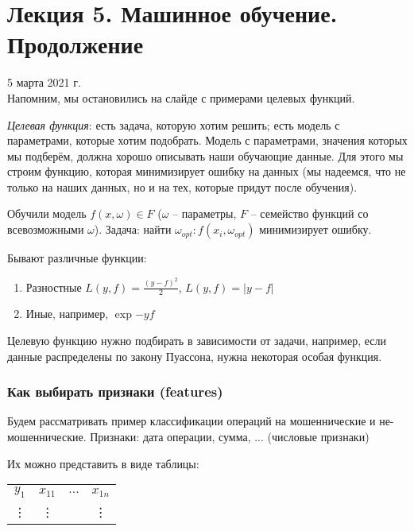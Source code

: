 \documentclass[main.tex]{subfiles}
\begin{document}
	
\section{Лекция 5. Машинное обучение. Продолжение}

5 марта 2021 г. \\

Напомним, мы остановились на слайде с примерами целевых функций.

\emph{Целевая функция}: есть задача, которую хотим решить; есть модель с параметрами, которые хотим подобрать.
Модель с параметрами, значения которых мы подберём, должна хорошо описывать наши обучающие данные.
Для этого мы строим функцию, которая минимизирует ошибку на данных (мы надеемся, что не только на наших данных, но и на тех, которые придут после обучения).

Обучили модель $f(x, \omega) \in F$ ($\omega$ -- параметры, $F$ -- семейство функций со всевозможными $\omega$).
Задача: найти $\omega_{opt} : f(x_i, \omega_{opt})$ минимизирует ошибку.

Бывают различные функции:

\begin{enumerate}[noitemsep]
	\item Разностные $L(y, f) = \frac{(y-f)^2}{2} $, $ L(y,f) = |y-f|  $
	\item Иные, например, $ \exp{-yf} $
\end{enumerate}

Целевую функцию нужно подбирать в зависимости от задачи, например, если данные распределены по закону Пуассона, нужна некоторая особая функция.

\subsubsection{Как выбирать признаки (features)}

Будем рассматривать пример классификации операций на мошеннические и не-мошеннические.
Признаки: дата операции, сумма, ... (числовые признаки)

Их можно представить в виде таблицы:
\begin{center}
	\begin{tabular}{c | c | c | c}
		\hline
		$y_1$ & $ x_{11} $ & $ ... $ & $ x_{1n} $ \\
		\vdots & \vdots &  & \vdots \\
		\hline
	\end{tabular}
\end{center}
\end{document}
